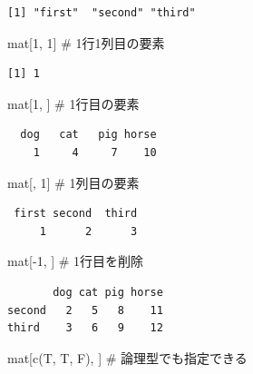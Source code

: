 \documentclass[
  letterpaper,
  DIV=11,
  numbers=noendperiod]{scrreprt}
\newenvironment{Shaded}{\begin{snugshade}}{\end{snugshade}}
\newcommand{\CommentTok}[1]{\textcolor[rgb]{0.37,0.37,0.37}{#1}}
\newcommand{\DecValTok}[1]{\textcolor[rgb]{0.68,0.00,0.00}{#1}}
\newcommand{\FunctionTok}[1]{\textcolor[rgb]{0.28,0.35,0.67}{#1}}
\newcommand{\NormalTok}[1]{\textcolor[rgb]{0.00,0.23,0.31}{#1}}
\newcommand{\SpecialCharTok}[1]{\textcolor[rgb]{0.37,0.37,0.37}{#1}}
\begin{document}
\begin{verbatim}
[1] "first"  "second" "third" 
\end{verbatim}

\begin{Shaded}
\begin{Highlighting}[]
\NormalTok{mat[}\DecValTok{1}\NormalTok{, }\DecValTok{1}\NormalTok{] }\CommentTok{\# 1行1列目の要素}
\end{Highlighting}
\end{Shaded}

\begin{verbatim}
[1] 1
\end{verbatim}

\begin{Shaded}
\begin{Highlighting}[]
\NormalTok{mat[}\DecValTok{1}\NormalTok{, ] }\CommentTok{\# 1行目の要素}
\end{Highlighting}
\end{Shaded}

\begin{verbatim}
  dog   cat   pig horse 
    1     4     7    10 
\end{verbatim}

\begin{Shaded}
\begin{Highlighting}[]
\NormalTok{mat[, }\DecValTok{1}\NormalTok{] }\CommentTok{\# 1列目の要素}
\end{Highlighting}
\end{Shaded}

\begin{verbatim}
 first second  third 
     1      2      3 
\end{verbatim}

\begin{Shaded}
\begin{Highlighting}[]
\NormalTok{mat[}\SpecialCharTok{{-}}\DecValTok{1}\NormalTok{, ] }\CommentTok{\# 1行目を削除}
\end{Highlighting}
\end{Shaded}

\begin{verbatim}
       dog cat pig horse
second   2   5   8    11
third    3   6   9    12
\end{verbatim}

\begin{Shaded}
\begin{Highlighting}[]
\NormalTok{mat[}\FunctionTok{c}\NormalTok{(T, T, F), ] }\CommentTok{\# 論理型でも指定できる}
\end{Highlighting}
\end{Shaded}
\end{document}
